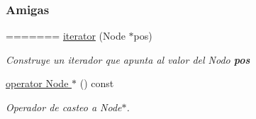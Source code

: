 \subsubsection*{\-Amigas}
\begin{DoxyCompactItemize}
=======
\hyperlink{classaed2_1_1map_1_1iterator_ab0ea21abcb32b6d5a72cf341b9029838_ab0ea21abcb32b6d5a72cf341b9029838}{iterator} (Node $\ast$pos)
\begin{DoxyCompactList}\small\item\em Construye un iterador que apunta al valor del Nodo {\bfseries pos} \end{DoxyCompactList}\item 
\hyperlink{classaed2_1_1map_1_1iterator_af609b04effc1c7ff9ec33b40c31bdc95_af609b04effc1c7ff9ec33b40c31bdc95}{operator Node $\ast$} () const
\begin{DoxyCompactList}\small\item\em Operador de casteo a Node$\ast$. \end{DoxyCompactList}\end{DoxyCompactItemize}
